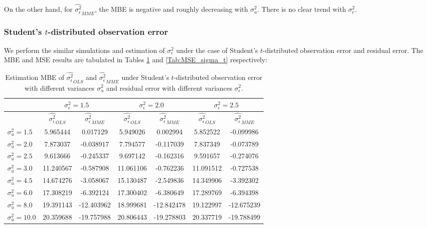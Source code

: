 \documentclass{article}
\begin{document}
On the other hand, for $\hat{\sigma^2_\epsilon}_{MME}$, the MBE is negative and roughly decreasing with $\sigma^2_u$. There is no clear trend with $\sigma^2_\epsilon$. 


\subsubsection{Student's $t$-distributed observation error}

We perform the similar simulations and estimation of $\sigma^2_\epsilon$ under the case of Student's $t$-distributed observation error and residual error.
The MBE and MSE results are tabulated in Tables \ref{Tab:MBE_sigma_t} and \ref{Tab:MSE_sigma_t} respectively:

\begin{table}[ht]
    \centering
    \caption{Estimation MBE of $\hat{\sigma^2_\epsilon}_{OLS}$ and $\hat{\sigma^2_\epsilon}_{MME}$ under Student's $t$-distributed observation error with different variances $\sigma^2_u$ and residual error with different variances $\sigma^2_\epsilon$.}
    \label{Tab:MBE_sigma_t}
    \begin{tabular}[t]{lcccccc}
        \hline
        &\multicolumn{2}{c}{$\sigma^2_\epsilon=1.5$}&\multicolumn{2}{c}{$\sigma^2_\epsilon=2.0$}&\multicolumn{2}{c}{$\sigma^2_\epsilon=2.5$}\\
        \hline
        &$\hat{\sigma^2_\epsilon}_{OLS}$&$\hat{\sigma^2_\epsilon}_{MME}$&$\hat{\sigma^2_\epsilon}_{OLS}$&
        $\hat{\sigma^2_\epsilon}_{MME}$&$\hat{\sigma^2_\epsilon}_{OLS}$&$\hat{\sigma^2_\epsilon}_{MME}$\\
        \hline
        $\sigma^2_u = 1.5$&5.965444&0.017129&5.949026&0.002994&5.852522&-0.099986\\
        $\sigma^2_u = 2.0$&7.873037&-0.038917&7.794577&-0.117039&7.837349&-0.073789\\
        $\sigma^2_u = 2.5$&9.613666&-0.245337&9.697142&-0.162316&9.591657&-0.274076\\
        $\sigma^2_u = 3.0$&11.240567&-0.587908&11.061106&-0.762236&11.091512&-0.727538\\
        $\sigma^2_u = 4.5$&14.674276&-3.058067&15.130487&-2.549836&14.349906&-3.392302\\
        $\sigma^2_u = 6.0$&17.308219&-6.392124&17.300402&-6.380649&17.289769&-6.394398\\
        $\sigma^2_u = 8.0$&19.391143&-12.403962&18.999681&-12.842478&19.122997&-12.675239\\
        $\sigma^2_u = 10.0$&20.359688&-19.757988&20.806443&-19.278803&20.337719&-19.788499\\
        \hline
    \end{tabular}
\end{table}
\end{document}
